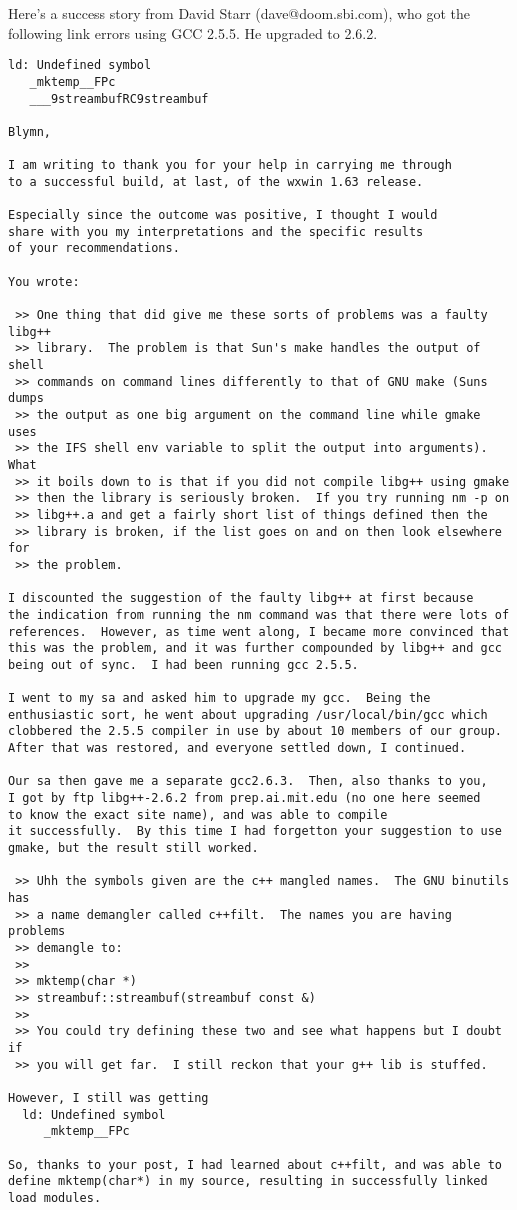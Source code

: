 Here's a success story from David Starr (dave@doom.sbi.com),
who got the following link errors using GCC 2.5.5. He upgraded
to 2.6.2.

\begin{verbatim}
ld: Undefined symbol 
   _mktemp__FPc 
   ___9streambufRC9streambuf 

Blymn,

I am writing to thank you for your help in carrying me through
to a successful build, at last, of the wxwin 1.63 release.

Especially since the outcome was positive, I thought I would
share with you my interpretations and the specific results
of your recommendations.

You wrote:

 >> One thing that did give me these sorts of problems was a faulty libg++
 >> library.  The problem is that Sun's make handles the output of shell
 >> commands on command lines differently to that of GNU make (Suns dumps
 >> the output as one big argument on the command line while gmake uses
 >> the IFS shell env variable to split the output into arguments).  What
 >> it boils down to is that if you did not compile libg++ using gmake
 >> then the library is seriously broken.  If you try running nm -p on
 >> libg++.a and get a fairly short list of things defined then the
 >> library is broken, if the list goes on and on then look elsewhere for
 >> the problem.

I discounted the suggestion of the faulty libg++ at first because
the indication from running the nm command was that there were lots of
references.  However, as time went along, I became more convinced that
this was the problem, and it was further compounded by libg++ and gcc 
being out of sync.  I had been running gcc 2.5.5.

I went to my sa and asked him to upgrade my gcc.  Being the
enthusiastic sort, he went about upgrading /usr/local/bin/gcc which
clobbered the 2.5.5 compiler in use by about 10 members of our group.
After that was restored, and everyone settled down, I continued.

Our sa then gave me a separate gcc2.6.3.  Then, also thanks to you,
I got by ftp libg++-2.6.2 from prep.ai.mit.edu (no one here seemed
to know the exact site name), and was able to compile
it successfully.  By this time I had forgetton your suggestion to use
gmake, but the result still worked.

 >> Uhh the symbols given are the c++ mangled names.  The GNU binutils has
 >> a name demangler called c++filt.  The names you are having problems
 >> demangle to:
 >> 
 >> mktemp(char *)
 >> streambuf::streambuf(streambuf const &)
 >>
 >> You could try defining these two and see what happens but I doubt if
 >> you will get far.  I still reckon that your g++ lib is stuffed.

However, I still was getting 
  ld: Undefined symbol 
     _mktemp__FPc 

So, thanks to your post, I had learned about c++filt, and was able to 
define mktemp(char*) in my source, resulting in successfully linked
load modules.
\end{verbatim}


